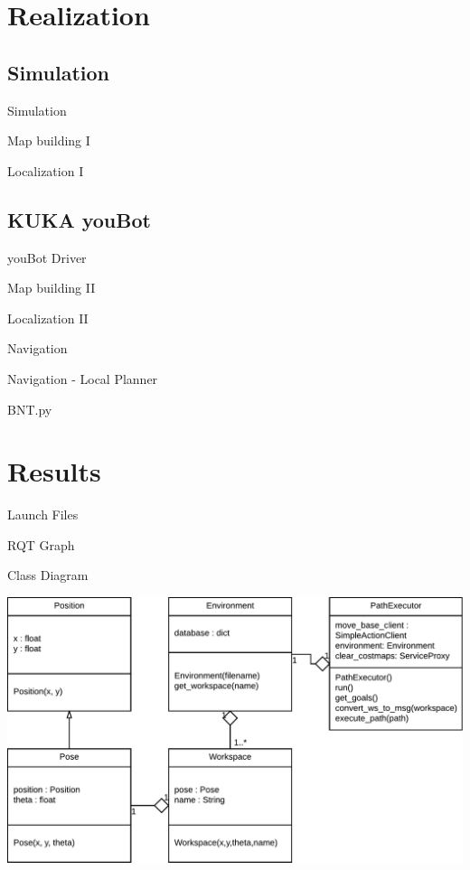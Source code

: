 \documentclass[12pt,aspectratio=43,xcolor={usenames,dvipsnames,table}]{beamer}
\begin{document}
\section{Realization}
\subsection{Simulation}
\begin{frame}{Simulation}
\end{frame}
\begin{frame}{Map building I}
\end{frame}
\begin{frame}{Localization I}
\end{frame}
\subsection{KUKA youBot}
\begin{frame}{youBot Driver}
\end{frame}
\begin{frame}{Map building II}
\end{frame}
\begin{frame}{Localization II}
\end{frame}
\begin{frame}{Navigation}
\end{frame}
\begin{frame}{Navigation - Local Planner}
\end{frame}
\begin{frame}{BNT.py}
\end{frame}

\section{Results}
\begin{frame}{Launch Files}
\end{frame}
\begin{frame}{RQT Graph}
\end{frame}

\begin{frame}{Class Diagram}
    \begin{center}
        \includegraphics[width=\linewidth,height=0.9\textheight,keepaspectratio]{gfx/01.pdf}
    \end{center}
\end{frame}
\end{document}
